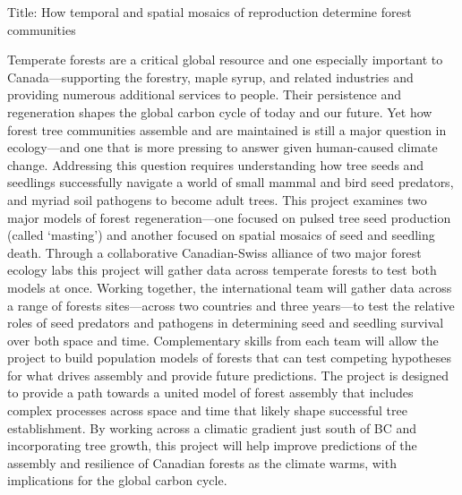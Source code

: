 \documentclass[11pt]{article}
\begin{document}

\renewcommand{\refname}{\CHead{}}

\setlength{\parindent}{0cm}
\setlength{\parskip}{5pt}



Title: How temporal and spatial mosaics of reproduction determine forest communities


Temperate forests are a critical global resource and one especially important to Canada---supporting the forestry, maple syrup, and related industries and providing numerous additional services to people. Their persistence and regeneration shapes the global carbon cycle of today and our future. Yet how forest tree communities assemble and are maintained is still a major question in ecology---and one that is more pressing to answer given human-caused climate change. Addressing this question requires understanding how tree seeds and seedlings successfully navigate a world of small mammal and bird seed predators, and myriad soil pathogens to become adult trees. This project examines two major models of forest regeneration---one focused on pulsed tree seed production (called `masting') and another focused on spatial mosaics of seed and seedling death. Through a collaborative Canadian-Swiss alliance of two major forest ecology labs this project will gather data across temperate forests to test both models at once. Working together, the international team will gather data across a range of forests sites---across two countries and three years---to test the relative roles of seed predators and pathogens in determining seed and seedling survival over both space and time. Complementary skills from each team will allow the project to build population models of forests that can test competing hypotheses for what drives assembly and provide future predictions. The project is designed to provide a path towards a united model of forest assembly that includes complex processes across space and time that likely shape successful tree establishment.  By working across a climatic gradient just south of BC and incorporating tree growth, this project will help improve predictions of the assembly and resilience of Canadian forests as the climate warms, with implications for the global carbon cycle. 
\end{document}
